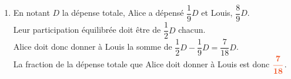 \documentclass[a4paper,11pt]{article}
\begin{document}
\begin{seance}{}
\begin{enumerate}
\item 
 En notant $D$ la dépense totale, Alice a dépensé $\dfrac{1}{9}D$ et Louis, $\dfrac{8}{9}D$.\\
Leur participation équilibrée doit être de $\dfrac{1}{2}D$ chacun.\\
Alice doit donc donner à Louis la somme de $\dfrac{1}{2}D - \dfrac{1}{9}D = \dfrac{7}{18}D$.\\
La fraction de la dépense totale que Alice doit donner à Louis est donc ${\color[HTML]{f15929}\boldsymbol{\dfrac{7}{18}}}$.



\end{enumerate}
\end{seance}
\end{document}
